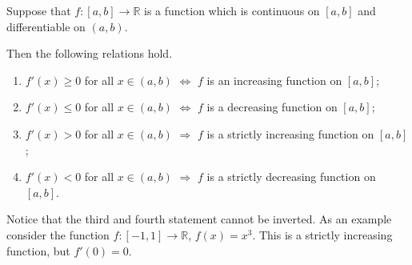 \documentclass[12pt]{article}
\begin{document}
Suppose that $f\colon [a,b] \to \mathbb R$ is a function which is continuous on $[a,b]$ and differentiable on $(a,b)$.

Then the following relations hold.

\begin{enumerate}
\item
$f'(x)\ge 0$ for all $x\in (a,b)$ $\Leftrightarrow$ $f$ is an increasing function on $[a,b]$;
\item
$f'(x)\le 0$ for all $x\in (a,b)$  $\Leftrightarrow$ $f$ is a decreasing function on $[a,b]$;
\item
$f'(x)>0$ for all $x\in (a,b)$ $\Rightarrow$ $f$ is a strictly increasing function on $[a,b]$;
\item
$f'(x)<0$ for all $x\in (a,b)$ $\Rightarrow$ $f$ is a strictly decreasing function on $[a,b]$.
\end{enumerate}

Notice that the third and fourth statement cannot be inverted. As an example consider the function $f\colon [-1,1]\to \mathbb R$, $f(x)=x^3$. This is a strictly increasing function, but $f'(0)=0$.
\end{document}
